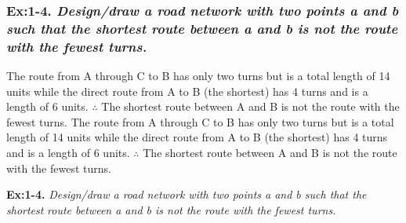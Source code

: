 


\subsubsection*{\textbf{\enspace Ex:1-4.} \emph{Design/draw a road network with two points a and b such that the shortest route between a and b is not the route with the fewest turns.}}

{\color{answer}{}
\begin{center}
\end{center}

The route from A through C to B has only two turns but is a total length of 14 units while the direct route from A to B (the shortest) has 4 turns and is a length of 6 units. $\therefore$ The shortest route between A and B is not the route with the fewest turns.
The route from A through C to B has only two turns but is a total length of 14 units while 
the direct route from A to B (the shortest) has 4 turns and is a length of 6 units. 
$\therefore$ The shortest route between A and B is not the route with the fewest turns.
}




{\raggedleft{}
\textbf{\enspace Ex:1-4.} \emph{Design/draw a road network with two points a and b such that the shortest} \newline{}
\emph{\text{\qquad\;\;\;\;} route between a and b is not the route with the fewest turns.}} \newline{}
%
\begin{minipage}{.80\textwidth}{\color{answer}{}
\begin{center}
\end{center}}
\end{minipage}

